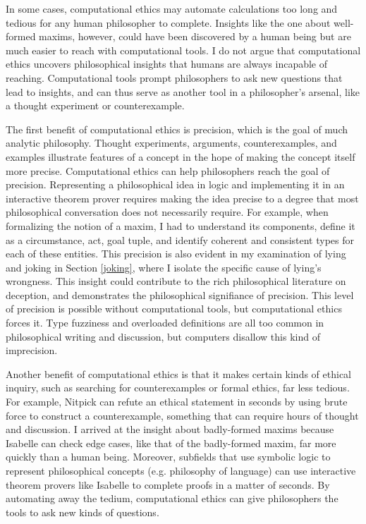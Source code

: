 \begin{isabellebody}
\begin{isamarkuptext}
In some cases, computational ethics may automate calculations too long and tedious for 
any human philosopher to complete. Insights like the one about well-formed maxims, however, could 
have been discovered by a human being but are much easier to reach with computational tools. I do not 
argue that computational ethics uncovers philosophical insights that humans are always incapable 
of reaching. Computational tools prompt philosophers 
to ask new questions that lead to insights, and can thus serve as another tool in a philosopher's arsenal, like a 
thought experiment or counterexample.

The first benefit of computational ethics is precision, which is the goal of much analytic
philosophy. Thought experiments, arguments, counterexamples, and examples 
illustrate features of a concept in the hope of making the concept itself more precise. Computational 
ethics can help philosophers reach the goal of precision. Representing a philosophical idea in logic 
and implementing it in an interactive theorem prover requires making the idea precise to a degree 
that most philosophical conversation does not necessarily require. For example, when formalizing the notion of a 
maxim, I had to understand its components, define it as a circumstance, act, goal tuple, and identify
coherent and consistent types for each of these entities. This precision is also evident in my examination
of lying and joking in Section \ref{joking}, where I isolate the specific cause of lying's wrongness.
This insight could contribute to the rich philosophical literature on deception, and demonstrates the 
philosophical signifiance of precision. This level of precision is possible 
without computational tools, but computational ethics forces it. Type fuzziness and overloaded definitions 
are all too common in philosophical writing and discussion, but computers disallow this kind of imprecision.

Another benefit of computational ethics is that it makes certain kinds of ethical inquiry, such as 
searching for counterexamples or formal ethics, far less tedious. For example, Nitpick can refute 
an ethical statement in seconds by using brute force to construct a counterexample, something that can require hours
of thought and discussion. I arrived at the insight about badly-formed maxims because Isabelle 
can check edge cases, like that of the badly-formed maxim, far more quickly than a human being. Moreover, 
subfields that use symbolic logic to represent philosophical concepts (e.g. philosophy of language) can 
use interactive theorem provers like Isabelle to complete proofs in a matter of seconds. By automating 
away the tedium, computational ethics can give philosophers the tools to ask new kinds of questions.


\end{isamarkuptext}
\end{isabellebody}
